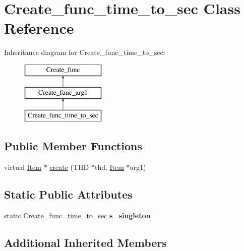 \hypertarget{classCreate__func__time__to__sec}{}\section{Create\+\_\+func\+\_\+time\+\_\+to\+\_\+sec Class Reference}
\label{classCreate__func__time__to__sec}
Inheritance diagram for Create\+\_\+func\+\_\+time\+\_\+to\+\_\+sec\+:\begin{figure}[H]
\begin{center}
\leavevmode
\includegraphics[height=3.000000cm]{classCreate__func__time__to__sec}
\end{center}
\end{figure}
\subsection*{Public Member Functions}
\begin{DoxyCompactItemize}
\item 
virtual \mbox{\hyperlink{classItem}{Item}} $\ast$ \mbox{\hyperlink{classCreate__func__time__to__sec_ab20d8dd5c9b411f9e9f59b17f781798c}{create}} (T\+HD $\ast$thd, \mbox{\hyperlink{classItem}{Item}} $\ast$arg1)
\end{DoxyCompactItemize}
\subsection*{Static Public Attributes}
\begin{DoxyCompactItemize}
\item 
\mbox{\label{classCreate__func__time__to__sec_a37da6b539fb65026c43c0beb1023a53f}} 
static \mbox{\hyperlink{classCreate__func__time__to__sec}{Create\+\_\+func\+\_\+time\+\_\+to\+\_\+sec}} {\bfseries s\+\_\+singleton}
\end{DoxyCompactItemize}
\subsection*{Additional Inherited Members}



